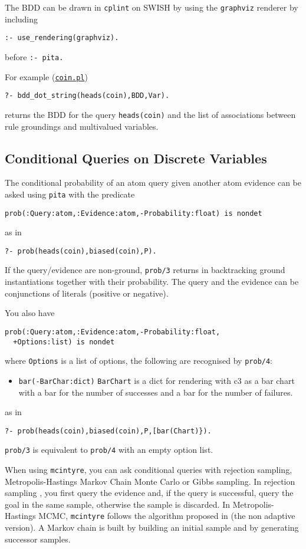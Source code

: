 The BDD can be drawn in \verb|cplint| on SWISH by using the \verb|graphviz| renderer
by including
\begin{verbatim}
:- use_rendering(graphviz).
\end{verbatim}
before \verb|:- pita.|

For example (\href{http://cplint.eu/e/coin.pl}{\texttt{coin.pl}})
\begin{verbatim}
?- bdd_dot_string(heads(coin),BDD,Var).
\end{verbatim}
returns the BDD for the query \verb|heads(coin)| and the list of associations between rule groundings and
multivalued variables.


\subsection{Conditional Queries on Discrete Variables}
\label{condq}
The conditional probability of an atom query given another atom evidence can be asked using \verb|pita| with the predicate
\begin{verbatim}
prob(:Query:atom,:Evidence:atom,-Probability:float) is nondet
\end{verbatim}
as in
\begin{verbatim}
?- prob(heads(coin),biased(coin),P).
\end{verbatim}
If the query/evidence are non-ground, \verb|prob/3| returns in backtracking ground instantiations together with their probability. The query and the evidence can be conjunctions of literals (positive or negative).


You also have
\begin{verbatim}
prob(:Query:atom,:Evidence:atom,-Probability:float,
  +Options:list) is nondet
\end{verbatim}
where \verb|Options| is a list of options, the following are recognised by \verb|prob/4|:
\begin{itemize}
\item \verb|bar(-BarChar:dict)|
\verb|BarChart| is a dict for rendering with c3 as a bar chart with
a bar for the number of successes and a bar for the number
of failures.
\end{itemize}
as in
\begin{verbatim}
?- prob(heads(coin),biased(coin),P,[bar(Chart)}).
\end{verbatim}
\verb|prob/3| is equivalent to \verb|prob/4| with an empty option list. 

When using \verb|mcintyre|, you can ask conditional queries with rejection sampling, Metropolis-Hastings Markov Chain Monte Carlo or Gibbs sampling.
In rejection sampling \cite{von195113}, you first query the evidence and, if the query is successful, query the goal in the same sample, otherwise
the sample is discarded.
In Metropolis-Hastings MCMC, \verb|mcintyre| follows the algorithm proposed in \cite{nampally2014adaptive} (the non adaptive version).
A Markov chain is built by building an initial sample and by generating successor samples.

